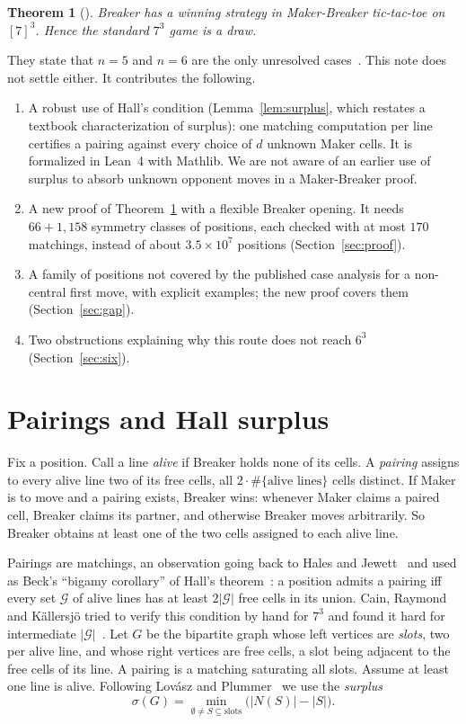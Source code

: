 \documentclass[11pt]{amsart}
\newtheorem{theorem}{Theorem}[section]
\theoremstyle{definition}
\theoremstyle{remark}
\begin{document}
\begin{theorem}[\cite{CRK2025}]\label{thm:main}
Breaker has a winning strategy in Maker-Breaker tic-tac-toe on $[7]^3$. Hence the standard $7^3$ game is a draw.
\end{theorem}

They state that $n=5$ and $n=6$ are the only unresolved cases~\cite[Sec.~6.2]{CRK2025}. This note does not settle either. It contributes the following.
\begin{enumerate}
\item A robust use of Hall's condition (Lemma~\ref{lem:surplus}, which restates a textbook characterization of surplus): one matching computation per line certifies a pairing against every choice of $d$ unknown Maker cells. It is formalized in Lean~4 with Mathlib. We are not aware of an earlier use of surplus to absorb unknown opponent moves in a Maker-Breaker proof.
\item A new proof of Theorem~\ref{thm:main} with a flexible Breaker opening. It needs $66+1{,}158$ symmetry classes of positions, each checked with at most $170$ matchings, instead of about $3.5\times10^7$ positions (Section~\ref{sec:proof}).
\item A family of positions not covered by the published case analysis for a non-central first move, with explicit examples; the new proof covers them (Section~\ref{sec:gap}).
\item Two obstructions explaining why this route does not reach $6^3$ (Section~\ref{sec:six}).
\end{enumerate}

\section{Pairings and Hall surplus}

Fix a position. Call a line \emph{alive} if Breaker holds none of its cells. A \emph{pairing} assigns to every alive line two of its free cells, all $2\cdot\#\{\text{alive lines}\}$ cells distinct. If Maker is to move and a pairing exists, Breaker wins: whenever Maker claims a paired cell, Breaker claims its partner, and otherwise Breaker moves arbitrarily. So Breaker obtains at least one of the two cells assigned to each alive line.

Pairings are matchings, an observation going back to Hales and Jewett~\cite{HalesJewett1963} and used as Beck's ``bigamy corollary'' of Hall's theorem~\cite{Beck2002,CRK2025}: a position admits a pairing iff every set $\mathcal G$ of alive lines has at least $2|\mathcal G|$ free cells in its union. Cain, Raymond and K\"allersj\"o tried to verify this condition by hand for $7^3$ and found it hard for intermediate $|\mathcal G|$~\cite[Sec.~5]{CRK2025}. Let $G$ be the bipartite graph whose left vertices are \emph{slots}, two per alive line, and whose right vertices are free cells, a slot being adjacent to the free cells of its line. A pairing is a matching saturating all slots. Assume at least one line is alive. Following Lov\'asz and Plummer~\cite[Sec.~1.3]{LovaszPlummer1986} we use the \emph{surplus}
\[
  \sigma(G)=\min_{\emptyset\ne S\subseteq \mathrm{slots}}\bigl(|N(S)|-|S|\bigr).
\]
\end{document}

